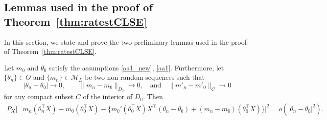 \subsection{Lemmas used in the proof of Theorem~\ref{thm:ratestCLSE}}\label{subsubsec:Theorem35}
In this section, we state and prove the two preliminary lemmas used in the proof of Theorem~\ref{thm:ratestCLSE}.
\begin{lemma} \label{lem:ratest_1CLSE} Let $m_0$ and $\theta_0$ satisfy the assumptions \ref{aa1_new}, \ref{aa1}. Furthermore, let  $\{\theta_n\} \in \Theta$ and $\{m_n\} \in \mathcal{M}_L$ be two non-random sequences such that
\begin{equation}\label{eq:rate_cond}
|\theta_n - \theta_0| \rightarrow 0, \qquad  \|m_n - m_0\|_{D_0}  \rightarrow 0, \quad \text{and} \quad \|{m}'_n - m'_0\|_{C}   \rightarrow 0
\end{equation}
 for any compact subset $C$ of the interior of $D_0$. Then
\begin{align*}
P_X\big|&m_n(\theta_n^{\top}X)   - m_0(\theta_0^{\top}X) - \{m_0'(\theta_0^{\top}X)X^{\top}(\theta_n - \theta_0) + (m_n-m_0)(\theta_0^{\top}X)\}  \big|^2 =o(|\theta_n-\theta_0|^2) .
\end{align*}
\end{lemma}




